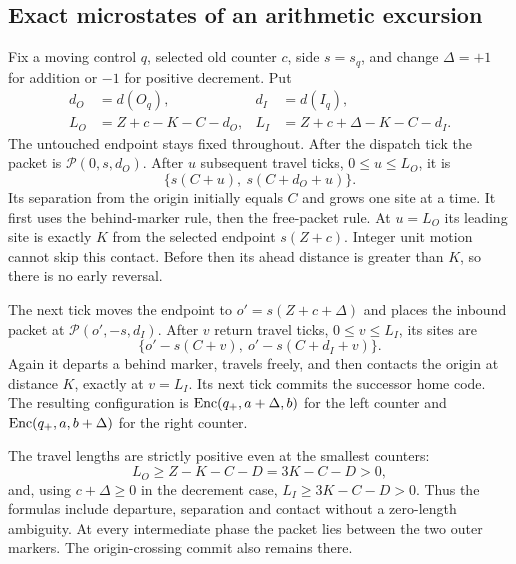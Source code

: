 \documentclass[11pt,a4paper]{article}
\numberwithin{equation}{section}
\begin{document}
\subsection{Exact microstates of an arithmetic excursion}
Fix a moving control $q$, selected old counter $c$, side $s=s_q$, and change
$\Delta=+1$ for addition or $-1$ for positive decrement. Put
\begin{align}
 d_O&=d(O_q),&d_I&=d(I_q),\\
 L_O&=Z+c-K-C-d_O,&
 L_I&=Z+c+\Delta-K-C-d_I.\label{fpa:bc:eq:flights}
\end{align}
The untouched endpoint stays fixed throughout. After the dispatch tick the
packet is $\mathcal P(0,s,d_O)$. After $u$ subsequent travel ticks,
$0\le u\le L_O$, it is
\begin{equation}
 \{s(C+u),\ s(C+d_O+u)\}.\label{fpa:bc:eq:outstate}
\end{equation}
Its separation from the origin initially equals $C$ and grows one site at a
time. It first uses the behind-marker rule, then the free-packet rule. At
$u=L_O$ its leading site is exactly $K$ from the selected endpoint
$s(Z+c)$. Integer unit motion cannot skip this contact. Before then its
ahead distance is greater than $K$, so there is no early reversal.

The next tick moves the endpoint to $o'=s(Z+c+\Delta)$ and places the inbound
packet at $\mathcal P(o',-s,d_I)$. After $v$ return travel ticks,
$0\le v\le L_I$, its sites are
\begin{equation}
 \{o'-s(C+v),\ o'-s(C+d_I+v)\}.\label{fpa:bc:eq:instate}
\end{equation}
Again it departs a behind marker, travels freely, and then contacts the origin
at distance $K$, exactly at $v=L_I$. Its next tick commits the successor home
code. The resulting configuration is
$\operatorname{Enc}(q_+,a+\Delta,b)$ for the left counter and
$\operatorname{Enc}(q_+,a,b+\Delta)$ for the right counter.

The travel lengths are strictly positive even at the smallest counters:
\[
 L_O\ge Z-K-C-D=3K-C-D>0,
\]
and, using $c+\Delta\ge0$ in the decrement case,
$L_I\ge3K-C-D>0$. Thus the formulas include departure, separation and contact
without a zero-length ambiguity. At every intermediate phase the packet lies
between the two outer markers. The origin-crossing commit also remains there.
\end{document}
